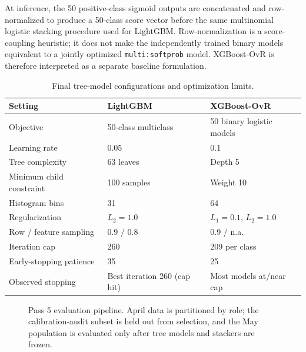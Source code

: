 \documentclass[conference]{IEEEtran}
\begin{document}
At inference, the 50 positive-class sigmoid outputs are concatenated and row-normalized to produce a 50-class score vector before the same multinomial logistic stacking procedure used for LightGBM. Row-normalization is a score-coupling heuristic; it does not make the independently trained binary models equivalent to a jointly optimized \texttt{multi:softprob} model. XGBoost-OvR is therefore interpreted as a separate baseline formulation.

\begin{table}[t]
\centering
\caption{Final tree-model configurations and optimization limits.}
\label{tab:tree_config}
\small
\begin{tabular}{p{}p{}p{}}
\toprule
Setting & LightGBM & XGBoost-OvR \\
\midrule
Objective & 50-class multiclass & 50 binary logistic models \\
Learning rate & 0.05 & 0.1 \\
Tree complexity & 63 leaves & Depth 5 \\
Minimum child constraint & 100 samples & Weight 10 \\
Histogram bins & 31 & 64 \\
Regularization & $L_2=1.0$ & $L_1=0.1$, $L_2=1.0$ \\
Row / feature sampling & 0.9 / 0.8 & 0.9 / n.a. \\
Iteration cap & 260 & 209 per class \\
Early-stopping patience & 35 & 25 \\
Observed stopping & Best iteration 260 (cap hit) & Most models at/near cap \\
\bottomrule
\end{tabular}
\end{table}

\begin{figure}[t]
\centering
{}
\caption{Pass 5 evaluation pipeline. April data is partitioned by role; the calibration-audit subset is held out from selection, and the May population is evaluated only after tree models and stackers are frozen.}
\label{fig:pass5_pipeline}
\end{figure}
\end{document}
